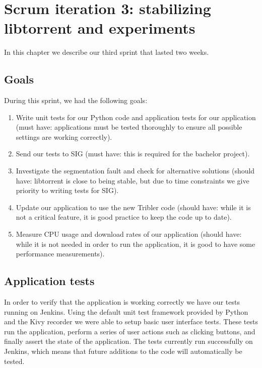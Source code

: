 \chapter{Scrum iteration 3: stabilizing libtorrent and experiments}
\label{cpt:iteration3}
	In this chapter we describe our third sprint that lasted two weeks.

	\section{Goals}
		During this sprint, we had the following goals:
	
		\begin{enumerate}
			\item Write unit tests for our Python code and application tests for our application (must have: applications must be tested thoroughly to ensure all possible settings are working correctly). 
			\item Send our tests to SIG (must have: this is required for the bachelor project).
			\item Investigate the segmentation fault and check for alternative solutions (should have: libtorrent is close to being stable, but due to time constraints we give priority to writing tests for SIG).
			\item Update our application to use the new Tribler code (should have: while it is not a critical feature, it is good practice to keep the code up to date).
			\item Measure CPU usage and download rates of our application (should have: while it is not needed in order to run the application, it is good to have some performance measurements).
		\end{enumerate}
		
	\section{Application tests}
		In order to verify that the application is working correctly we have our tests running on Jenkins. Using the default unit test framework provided by Python and the Kivy recorder we were able to setup basic user interface tests. These tests run the application, perform a series of user actions such as clicking buttons, and finally assert the state of the application. The tests currently run successfully on Jenkins, which means that future additions to the code will automatically be tested.
		
